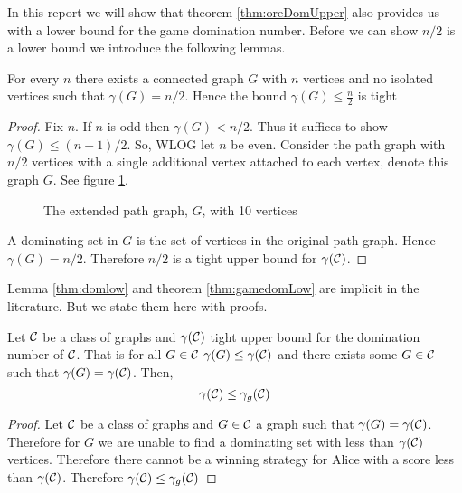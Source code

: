 In this report we will show that theorem \ref{thm:oreDomUpper} also provides us with a lower bound for the game domination number.  
Before we can show $n/2$ is a lower bound we introduce the following lemmas. 
\begin{lemma}\label{lem:ore_is_tight}
    For every $n$ there exists a connected graph $G$ with $n$ vertices and no isolated vertices such that $\gamma(G) = n/2$. Hence the bound    
    $\gamma(G) \leq \frac{n}{2}$ is tight
\end{lemma}
\begin{proof}
    Fix $n$. If $n$ is odd then $\gamma(G) < n/2$. Thus it suffices to show $\gamma(G) \leq (n-1)/2$. So, WLOG let $n$ be even. Consider the path graph with $n/2$ vertices with a single additional vertex attached to each vertex, denote this graph $G$. See figure \ref{fig:ext_path}.
    \begin{figure}[H]
        \centering
        \caption{The extended path graph, $G$, with 10 vertices}
        \label{fig:ext_path}
    \end{figure}
    A dominating set in $G$ is the set of vertices in the original path graph. Hence $\gamma(G)= n/2$. Therefore $n/2$ is a tight upper bound for $\gamma(\mathcal{C})$. 
\end{proof}

Lemma \ref{thm:domlow} and theorem \ref{thm:gamedomLow} are implicit in the literature. But we state them here with proofs.

\begin{lemma}\label{thm:domlow}
    Let $\mathcal{C}$ be a class of graphs and $\gamma(\mathcal{C})$ tight upper bound for the domination number of $\mathcal{C}$. That is for all $G\in\mathcal{C}$ $\gamma(G)\leq\gamma(\mathcal{C})$ and there exists some $G\in\mathcal{C}$ such that $\gamma(G)=\gamma(\mathcal{C})$. Then,
    \[\gamma(\mathcal{C}) \leq  \gamma_g(\mathcal{C})\]
\end{lemma}
\begin{proof}
    Let $\mathcal{C}$ be a class of graphs and $G\in\mathcal{C}$ a graph such that $\gamma(G) = \gamma(\mathcal{C})$. 
    Therefore for $G$ we are unable to find a dominating set with less than $ \gamma(\mathcal{C}) $ vertices.
    Therefore there cannot be a winning strategy for Alice with a score less than $\gamma(\mathcal{C})$.
    Therefore $\gamma(\mathcal{C}) \leq \gamma_g(\mathcal{C})$
\end{proof}

